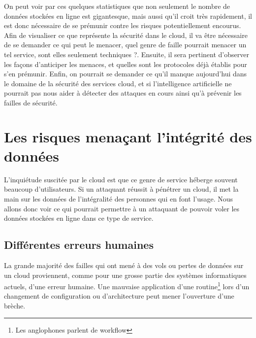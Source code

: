 \documentclass[a4paper, 12pt]{article}
\begin{document}
\begin{spacing}{1.1}
    On peut voir par ces quelques statistiques que non seulement le nombre de
    données stockées en ligne est gigantesque, mais aussi qu'il croit très
    rapidement, il est donc nécessaire de se prémunir contre les risques
    potentiellement encourus. \\

    Afin de visualiser ce que représente la sécurité dans le cloud, il va être
    nécessaire de se demander ce qui peut le menacer, quel genre de faille
    pourrait menacer un tel service, sont elles seulement techniques ?. Ensuite,
    il sera pertinent d'observer les façons d'anticiper les menaces, et quelles
    sont les protocoles déjà établis pour s'en prémunir. Enfin, on pourrait se
    demander ce qu'il manque aujourd'hui dans le domaine de la sécurité des
    services cloud, et si l'intelligence artificielle ne pourrait pas nous aider
    à détecter des attaques en cours ainsi qu'à prévenir les failles de
    sécurité.

  \section{Les risques menaçant l'intégrité des données}
    L'inquiétude suscitée par le cloud est que ce genre de service héberge
    souvent beaucoup d'utilisateurs. Si un attaquant réussit à pénétrer un
    cloud, il met la main sur les données de l'intégralité des personnes qui en
    font l'usage. Nous allons donc voir ce qui pourrait permettre à un attaquant
    de pouvoir voler les données stockées en ligne dans ce type de service.

    \subsection{Différentes erreurs humaines}
      La grande majorité des failles qui ont mené à des vols ou pertes de
      données sur un cloud proviennent, comme pour une grosse partie des
      systèmes informatiques actuels, d'une erreur humaine. Une mauvaise
      application d'une routine\footnote{Les anglophones parlent de workflow}
      lors d'un changement de configuration ou d'architecture peut mener
      l'ouverture d'une brèche.


\end{spacing}
\end{document}
